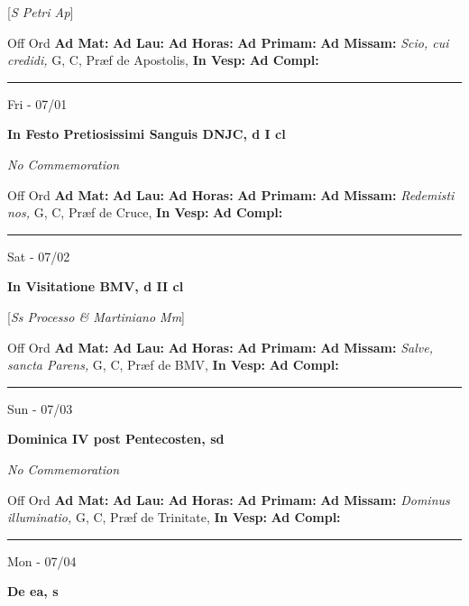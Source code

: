 \documentclass[letterpaper, 10pt]{article}
\begin{document}
[\textit{S Petri Ap}]
\begin{justify}
Off Ord
\textbf{Ad Mat: }
\textbf{Ad Lau: }
\textbf{Ad Horas: }
\textbf{Ad Primam: }
\textbf{Ad Missam:} \textit{Scio, cui credidi, } G, C, Præf de Apostolis, 
\textbf{In Vesp: }
\textbf{Ad Compl: }\end{justify}



\hrule
\begin{center}
Fri - 07/01
\end{center}\textbf{ \large In Festo Pretiosissimi Sanguis DNJC, \textnormal{\normalsize d I cl}}

\textit{No Commemoration}\begin{justify}
Off Ord
\textbf{Ad Mat: }
\textbf{Ad Lau: }
\textbf{Ad Horas: }
\textbf{Ad Primam: }
\textbf{Ad Missam:} \textit{Redemisti nos, } G, C, Præf de Cruce, 
\textbf{In Vesp: }
\textbf{Ad Compl: }\end{justify}



\hrule
\begin{center}
Sat - 07/02
\end{center}\textbf{ \large In Visitatione BMV, \textnormal{\normalsize d II cl}}

[\textit{Ss Processo \& Martiniano Mm}]
\begin{justify}
Off Ord
\textbf{Ad Mat: }
\textbf{Ad Lau: }
\textbf{Ad Horas: }
\textbf{Ad Primam: }
\textbf{Ad Missam:} \textit{Salve, sancta Parens, } G, C, Præf de BMV, 
\textbf{In Vesp: }
\textbf{Ad Compl: }\end{justify}



\hrule
\begin{center}
Sun - 07/03
\end{center}\textbf{ \large Dominica IV post Pentecosten, \textnormal{\normalsize sd}}

\textit{No Commemoration}\begin{justify}
Off Ord
\textbf{Ad Mat: }
\textbf{Ad Lau: }
\textbf{Ad Horas: }
\textbf{Ad Primam: }
\textbf{Ad Missam:} \textit{Dominus illuminatio, } G, C, Præf de Trinitate, 
\textbf{In Vesp: }
\textbf{Ad Compl: }\end{justify}



\hrule
\begin{center}
Mon - 07/04
\end{center}\textbf{ \large De ea, \textnormal{\normalsize s}}
\end{document}
